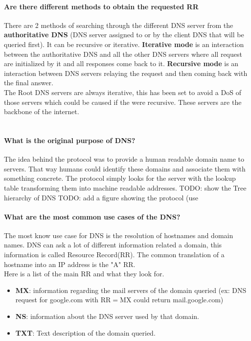 \paragraph{Are there different methods to obtain the requested RR}
There are 2 methods of searching through the different DNS server from the \textbf{authoritative DNS} (DNS server assigned to or by the client DNS that will be queried first). It can be recursive or iterative. \textbf{Iterative mode} is an interaction between the authoritative DNS and all the other DNS servers where all request are initialized by it and all responses come back to it. \textbf{Recursive mode} is an interaction between DNS servers relaying the request and then coming back with the final answer. \\The Root DNS servers are always iterative, this has been set to avoid a DoS of those servers which could be caused if the were recursive. These servers are the backbone of the internet.\\
\\
\paragraph{What is the original purpose of DNS?}
The idea behind the protocol was to provide a human readable domain name to servers. That way humans could identify these domains and  associate them with something concrete. The protocol simply looks for the server with the lookup table transforming them into machine readable addresses.
TODO: show the Tree hierarchy of DNS
TODO: add a figure showing the protocol
(use %
\paragraph{What are the most common use cases of the DNS?}
The most know use case for DNS is the resolution of hostnames and domain names. DNS can ask a lot of different information related a domain, this information is called Resource Record(RR). The common translation of a hostname into an IP address is the "A" RR.\\ Here is a list of the main RR and what they look for.\\
\begin{itemize}[noitemsep]
\item \textbf{MX}: information regarding the mail servers of the domain queried (ex: DNS request for google.com with RR$=$MX could return mail.google.com) \\
\item \textbf{NS}: information about the DNS server used by that domain.\\
\item \textbf{TXT}: Text description of the domain queried.
\end{itemize}

